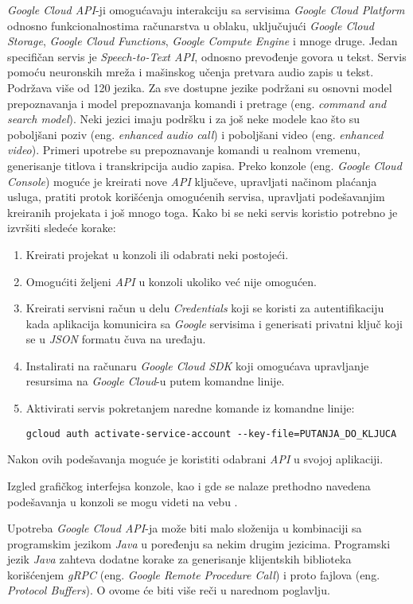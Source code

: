 \documentclass[android.tex]{subfiles}
\begin{document}
\textit{Google Cloud API}-ji omogućavaju interakciju sa servisima \textit{Google Cloud Platform} odnosno funkcionalnostima računarstva u oblaku, uključujući \textit{Google Cloud Storage}, \textit{Google Cloud Functions}, \textit{Google Compute Engine} i mnoge druge. Jedan specifičan servis je \textit{Speech-to-Text API}, odnosno prevođenje govora u tekst. Servis pomoću neuronskih mreža i mašinskog učenja pretvara audio zapis u tekst. Podržava više od 120 jezika. Za sve dostupne jezike podržani su osnovni model prepoznavanja i model prepoznavanja komandi i pretrage (eng. \textit{command and search model}). Neki jezici imaju podršku i za još neke modele kao što su poboljšani poziv (eng. \textit{enhanced audio call}) i poboljšani video (eng. \textit{enhanced video}). Primeri upotrebe su prepoznavanje komandi u realnom vremenu, generisanje titlova i transkripcija audio zapisa. Preko konzole (eng. \textit{Google Cloud Console}) moguće je kreirati nove \textit{API} ključeve, upravljati načinom plaćanja usluga, pratiti protok korišćenja omogućenih servisa, upravljati podešavanjim kreiranih projekata i još mnogo toga. Kako bi se neki servis koristio potrebno je izvršiti sledeće korake: 
\begin{enumerate}
    \item Kreirati projekat u konzoli ili odabrati neki postojeći.
    \item Omogućiti željeni \textit{API} u konzoli ukoliko već nije omogućen. 
    \item Kreirati servisni račun u delu \textit{Credentials} koji se koristi za autentifikaciju kada aplikacija komunicira sa \textit{Google} servisima i generisati privatni ključ koji se u \textit{JSON} formatu čuva na uređaju.
    \item Instalirati na računaru \textit{Google Cloud SDK} koji omogućava upravljanje resursima na \textit{Google Cloud}-u putem komandne linije.
    \item Aktivirati servis pokretanjem naredne komande iz komandne linije:
    
    \verb|gcloud auth activate-service-account --key-file=PUTANJA_DO_KLJUCA|
\end{enumerate}
Nakon ovih podešavanja moguće je koristiti odabrani \textit{API} u svojoj aplikaciji.

Izgled grafičkog interfejsa  konzole, kao i gde se nalaze prethodno navedena podešavanja u konzoli se mogu videti na vebu \cite{sajt:googleConsole}.

Upotreba \textit{Google Cloud API}-ja može biti malo složenija u kombinaciji sa programskim jezikom \textit{Java} u poređenju sa nekim drugim jezicima. Programski jezik \textit{Java} zahteva dodatne korake za generisanje klijentskih biblioteka korišćenjem \textit{gRPC} (eng. \textit{Google Remote Procedure Call}) i proto fajlova (eng. \textit{Protocol Buffers}). O ovome će biti više reči u narednom poglavlju.
\end{document}

